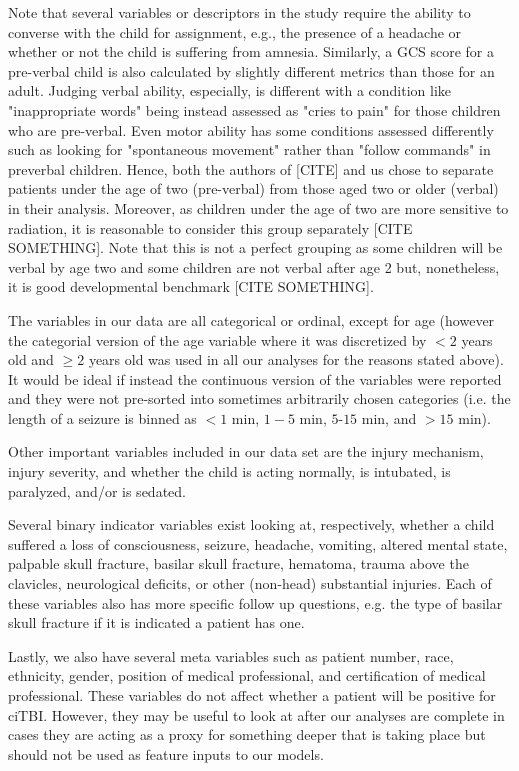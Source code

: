 \documentclass[11pt]{amsart}
\begin{document}
Note that several variables or descriptors in the study require the ability to converse with the child for assignment, e.g., the presence of a headache or whether or not the child is suffering from amnesia. Similarly, a GCS score for a pre-verbal child is also calculated by slightly different metrics than those for an adult. Judging verbal ability, especially, is different with a condition like "inappropriate words" being instead assessed as "cries to pain" for those children who are pre-verbal. Even motor ability has some conditions assessed differently such as looking for "spontaneous
movement" rather than "follow commands" in preverbal children. Hence, both the authors of [CITE] and us chose to separate patients under the age of two (pre-verbal) from those aged two or older (verbal) in their analysis. Moreover, as children under the age of two are more sensitive to radiation, it is reasonable to consider this group separately [CITE SOMETHING]. Note that this is not a perfect grouping as some children will be verbal by age two and some children are not verbal after age 2 but, nonetheless, it is good developmental benchmark [CITE SOMETHING].

The variables in our data are all categorical or ordinal, except for age (however the categorial version of the age variable where it was discretized by $< 2$ years old and $\geq 2$ years old was used in all our analyses for the reasons stated above). It would be ideal if instead the continuous version of the variables were reported and they were not pre-sorted into sometimes arbitrarily chosen categories (i.e. the length of a seizure is binned as  $< 1$ min, $1 - 5$ min, $5 ‐ 15$ min, and $> 15$ min).

Other important variables included in our data set are the injury mechanism, injury severity, and whether the child is acting normally, is intubated, is paralyzed, and/or is sedated.

Several binary indicator variables exist looking at, respectively, whether a child suffered a loss of consciousness, seizure, headache, vomiting, altered mental state, palpable skull fracture, basilar skull fracture, hematoma, trauma above the clavicles, neurological deficits, or other (non-head) substantial injuries. Each of these variables also has more specific follow up questions, e.g. the type of basilar skull fracture if it is indicated a patient has one.

Lastly, we also have several meta variables such as patient number, race, ethnicity, gender, position of medical professional, and certification of medical professional. These variables do not affect whether a patient will be positive for ciTBI. However, they may be useful to look at after our analyses are complete in cases they are acting as a proxy for something deeper that is taking place but should not be used as feature inputs to our models.
\end{document}
